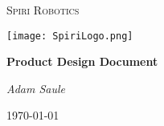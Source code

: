 \begin{titlepage}
	\centering %
	{\scshape\huge Spiri Robotics \par}
	\vspace{1.5cm}
	\texttt{[image: SpiriLogo.png]}\par\vspace{1cm}
	\vspace{1cm}
	{\huge\bfseries Product Design Document\par}
	\vspace{2cm}
	{\Large\itshape Adam Saule\par}
	\vfill
	{\large \today\par}
\end{titlepage}


